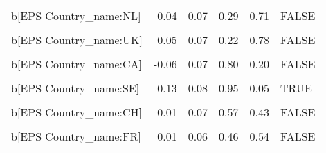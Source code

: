 \begin{table}
\begin{tabular}[t]{lrrrrl}
b[EPS Country\_name:NL] & 0.04 & 0.07 & 0.29 & 0.71 & FALSE\\
\cellcolor{gray!10}{b[(Intercept) Country\_name:UK]} & \cellcolor{gray!10}{0.05} & \cellcolor{gray!10}{0.19} & \cellcolor{gray!10}{0.40} & \cellcolor{gray!10}{0.60} & \cellcolor{gray!10}{FALSE}\\
b[EPS Country\_name:UK] & 0.05 & 0.07 & 0.22 & 0.78 & FALSE\\
\cellcolor{gray!10}{b[(Intercept) Country\_name:CA]} & \cellcolor{gray!10}{-0.05} & \cellcolor{gray!10}{0.18} & \cellcolor{gray!10}{0.61} & \cellcolor{gray!10}{0.39} & \cellcolor{gray!10}{FALSE}\\
b[EPS Country\_name:CA] & -0.06 & 0.07 & 0.80 & 0.20 & FALSE\\
\cellcolor{gray!10}{b[(Intercept) Country\_name:SE]} & \cellcolor{gray!10}{-0.10} & \cellcolor{gray!10}{0.23} & \cellcolor{gray!10}{0.67} & \cellcolor{gray!10}{0.33} & \cellcolor{gray!10}{FALSE}\\
b[EPS Country\_name:SE] & -0.13 & 0.08 & 0.95 & 0.05 & TRUE\\
\cellcolor{gray!10}{b[(Intercept) Country\_name:CH]} & \cellcolor{gray!10}{-0.01} & \cellcolor{gray!10}{0.18} & \cellcolor{gray!10}{0.51} & \cellcolor{gray!10}{0.49} & \cellcolor{gray!10}{FALSE}\\
b[EPS Country\_name:CH] & -0.01 & 0.07 & 0.57 & 0.43 & FALSE\\
\cellcolor{gray!10}{b[(Intercept) Country\_name:FR]} & \cellcolor{gray!10}{0.01} & \cellcolor{gray!10}{0.18} & \cellcolor{gray!10}{0.48} & \cellcolor{gray!10}{0.52} & \cellcolor{gray!10}{FALSE}\\
b[EPS Country\_name:FR] & 0.01 & 0.06 & 0.46 & 0.54 & FALSE\\
\bottomrule
\end{tabular}
\end{table}
